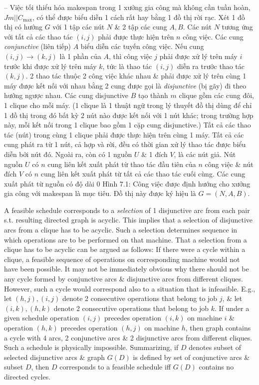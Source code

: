 \documentclass{article}
\begin{document}
\begin{itemize}
\begin{itemize}
        -- Việc tối thiểu hóa makespan trong 1 xưởng gia công mà không cần tuần hoàn, $Jm||C_{\max}$, có thể được biểu diễn 1 cách rất hay bằng 1 đồ thị rời rạc. Xét 1 đồ thị có hướng $G$ với 1 tập các nút $N$ \& 2 tập các cung $A,B$. Các nút $N$ tương ứng với tất cả các thao tác $(i,j)$ phải được thực hiện trên $n$ công việc. Các cung {\it conjunctive} (liên tiếp) $A$ biểu diễn các tuyến công việc. Nếu cung $(i,j)\to(k,j)$ là 1 phần của $A$, thì công việc $j$ phải được xử lý trên máy $i$ trước khi được xử lý trên máy $k$, tức là thao tác $(i,j)$ diễn ra trước thao tác $(k,j)$. 2 thao tác thuộc 2 công việc khác nhau \& phải được xử lý trên cùng 1 máy được kết nối với nhau bằng 2 cung được gọi là {\it disjunctive} (bị gãy) đi theo hướng ngược nhau. Các cung disjunctive $B$ tạo thành $m$ clique gồm các cung đôi, 1 clique cho mỗi máy. (1 clique là 1 thuật ngữ trong lý thuyết đồ thị dùng để chỉ 1 đồ thị trong đó bất kỳ 2 nút nào được kết nối với 1 nút khác; trong trường hợp này, mỗi kết nối trong 1 clique bao gồm 1 cặp cung disjunctive.) Tất cả các thao tác (nút) trong cùng 1 clique phải được thực hiện trên cùng 1 máy. Tất cả các cung phát ra từ 1 nút, cả hợp và rời, đều có thời gian xử lý thao tác được biểu diễn bởi nút đó. Ngoài ra, còn có 1 nguồn $U$ \& 1 đích $V$, là các nút giả. Nút nguồn $U$ có $n$ cung liên kết xuất phát từ thao tác đầu tiên của $n$ công việc \& nút đích $V$ có $n$ cung liên kết xuất phát từ tất cả các thao tác cuối cùng. Các cung xuất phát từ nguồn có độ dài 0 {\sf Hình 7.1: Công việc được định hướng cho xưởng gia công với makespan là mục tiêu}. Đồ thị này được ký hiệu là $G = (N,A,B)$.

        A feasible schedule corresponds to a {\it selection} of 1 disjunctive arc from each pair s.t. resulting directed graph is acyclic. This implies that a selection of disjunctive arcs from a clique has to be acyclic. Such a selection determines sequence in which operations are to be performed on that machine. That a selection from a clique has to be acyclic can be argued as follows: If there were a cycle within a clique, a feasible sequence of operations on corresponding machine would not have been possible. It may not be immediately obvious why there should not be any cycle formed by conjunctive arcs \& disjunctive arcs from different cliques. However, such a cycle would correspond also to a situation that is infeasible. E.g., let $(h,j),(i,j)$ denote 2 consecutive operations that belong to job $j$, \& let $(i,k),(h,k)$ denote 2 consecutive operations that belong to job $k$. If under a given schedule operation $(i,j)$ precedes operation $(i,k)$ on machine $i$ \& operation $(h,k)$ precedes operation $(h,j)$ on machine $h$, then graph contains a cycle with 4 arcs, 2 conjunctive arcs \& 2 disjunctive arcs from different cliques. Such a schedule is physically impossible. Summarizing, if $D$ denotes subset of selected disjunctive arcs \& graph $G(D)$ is defined by set of conjunctive arcs \& subset $D$, then $D$ corresponds to a feasible schedule iff $G(D)$ contains no directed cycles.


\end{itemize}
\end{itemize}
\end{document}
